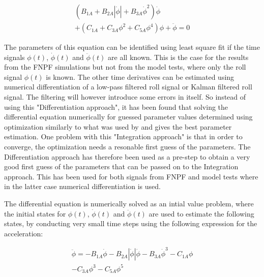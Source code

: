             
    
    \begin{equation}
\begin{aligned}
\left(B_{1A} + B_{2A} \left|{\dot{\phi}}\right| + B_{3A} \dot{\phi}^{2}\right) \dot{\phi} \\ + \left(C_{1A} + C_{3A} \phi^{2} + C_{5A} \phi^{4}\right) \phi + \ddot{\phi} = 0
\end{aligned}
\label{eq:equation}
\end{equation}

    

    The parameters of this equation can be identified using least square fit
if the time signals $\phi(t)$, $\dot{\phi}(t)$ and
$\ddot{\phi}(t)$ are all known. This is the case for the results from
the FNPF simulations but not from the model tests, where only the roll
signal $\phi(t)$ is known. The other time derivatives can be estimated
using numerical differentiation of a low-pass filtered roll signal or
Kalman filtered roll signal. The filtering will however introduce some
errors in itself. So instead of using this "Differentiation approach",
it has been found that solving the differential equation numerically for
guessed parameter values determined using optimization similarly to what
was used by \cite{7505983/FJHQJJUH} and \cite{7505983/24TNAV5Z} gives
the best parameter estimation. One problem with this "Integration
approach" is that in order to converge, the optimization needs a
resonable first guess of the parameters. The Differentiation approach
has therefore been used as a pre-step to obtain a very good first guess
of the parameters that can be passed on to the Integration approach.
This has been used for both signals from FNPF and model tests where in
the latter case numerical differentiation is used.

The differential equation is numerically solved as an intial value
problem, where the initial states for $\phi(t)$, $\dot{\phi}(t)$ and
$\ddot{\phi}(t)$ are used to estimate the following states, by
conducting very small time steps using the following expression for the
acceleration:
 
            
    
    \begin{equation}
\begin{aligned}
\ddot{\phi} = - B_{1A} \dot{\phi} - B_{2A} \left|{\dot{\phi}}\right| \dot{\phi} - B_{3A} \dot{\phi}^{3} - C_{1A} \phi \\ - C_{3A} \phi^{3} - C_{5A} \phi^{5}
\end{aligned}
\label{eq:equation}
\end{equation}

